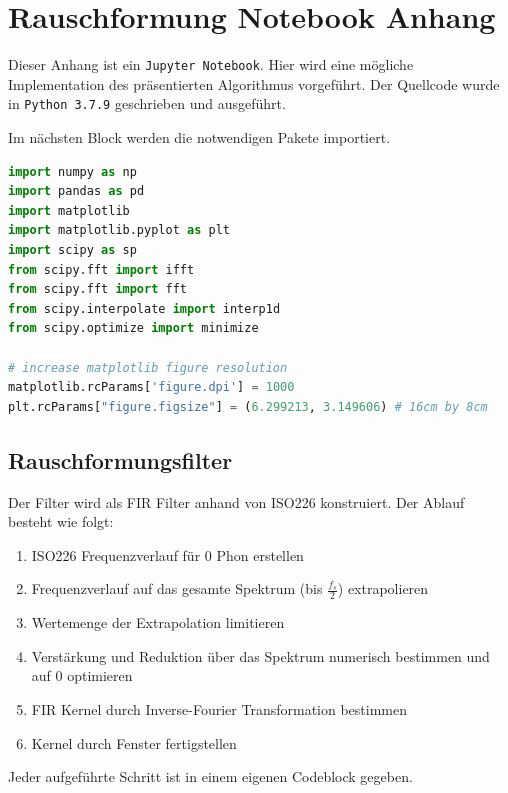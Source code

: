 \hypertarget{rauschformung-notebook-anhang}{%
\section{Rauschformung Notebook
Anhang}\label{rauschformung-notebook-anhang}}

Dieser Anhang ist ein \texttt{Jupyter Notebook}. Hier wird eine mögliche
Implementation des präsentierten Algorithmus vorgeführt. Der Quellcode
wurde in \texttt{Python 3.7.9} geschrieben und ausgeführt.

Im nächsten Block werden die notwendigen Pakete importiert.

\begin{lstlisting}[language=Python]
import numpy as np
import pandas as pd
import matplotlib
import matplotlib.pyplot as plt
import scipy as sp
from scipy.fft import ifft
from scipy.fft import fft
from scipy.interpolate import interp1d
from scipy.optimize import minimize

# increase matplotlib figure resolution
matplotlib.rcParams['figure.dpi'] = 1000
plt.rcParams["figure.figsize"] = (6.299213, 3.149606) # 16cm by 8cm
\end{lstlisting}

\hypertarget{rauschformungsfilter}{%
\subsection{Rauschformungsfilter}\label{rauschformungsfilter}}

Der Filter wird als FIR Filter anhand von ISO226 konstruiert. Der Ablauf
besteht wie folgt:

\begin{enumerate}
\tightlist
\item
  ISO226 Frequenzverlauf für 0 Phon erstellen
\item
  Frequenzverlauf auf das gesamte Spektrum (bis \(\frac{f_s}{2}\))
  extrapolieren
\item
  Wertemenge der Extrapolation limitieren
\item
  Verstärkung und Reduktion über das Spektrum numerisch bestimmen und
  auf 0 optimieren
\item
  FIR Kernel durch Inverse-Fourier Transformation bestimmen
\item
  Kernel durch Fenster fertigstellen
\end{enumerate}

Jeder aufgeführte Schritt ist in einem eigenen Codeblock gegeben.

